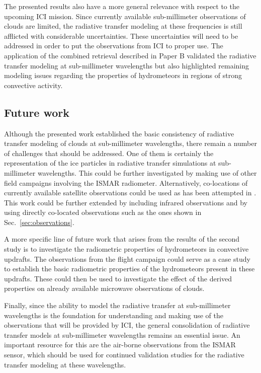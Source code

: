 The presented results also have a more general relevance with respect to the
upcoming ICI mission. Since currently available sub-millimeter observations of
clouds are limited, the radiative transfer modeling at these frequencies is
still afflicted with considerable uncertainties. These uncertainties will need
to be addressed in order to put the observations from ICI to proper use. The
application of the combined retrieval described in Paper B validated the
radiative transfer modeling at sub-millimeter wavelengths but also highlighted
remaining modeling issues regarding the properties of hydrometeors in regions of
strong convective activity.

\subsection{Future work}

Although the presented work established the basic consistency of radiative
transfer modeling of clouds at sub-millimeter wavelengths, there remain a number
of challenges that should be addressed. One of them is certainly the
representation of the ice particles in radiative transfer simulations at
sub-millimeter wavelengths. This could be further investigated by making use of
other field campaigns involving the ISMAR radiometer. Alternatively,
co-locations of currently available satellite observations could be used as has
been attempted in \citet{ekelund19}. This work could be further extended by
including infrared observations and by using directly co-located observations
such as the ones shown in Sec.~\ref{sec:observations}.

A more specific line of future work that arises from the results of the second
study is to investigate the radiometric properties of hydrometeors in convective
updrafts. The observations from the flight campaign could serve as a case study
to establish the basic radiometric properties of the hydrometeors present in
these updrafts. These could then be used to investigate the effect of the
derived properties on already available microwave observations of clouds.

Finally, since the ability to model the radiative transfer at sub-millimeter
wavelengths is the foundation for understanding and making use of the observations
that will be provided by ICI, the general consolidation of radiative transfer models at
sub-millimeter wavelengths remains an essential issue. An important resource for this
are the air-borne observations from the ISMAR sensor, which should be used for continued
validation studies for the radiative transfer modeling at these wavelengths.

